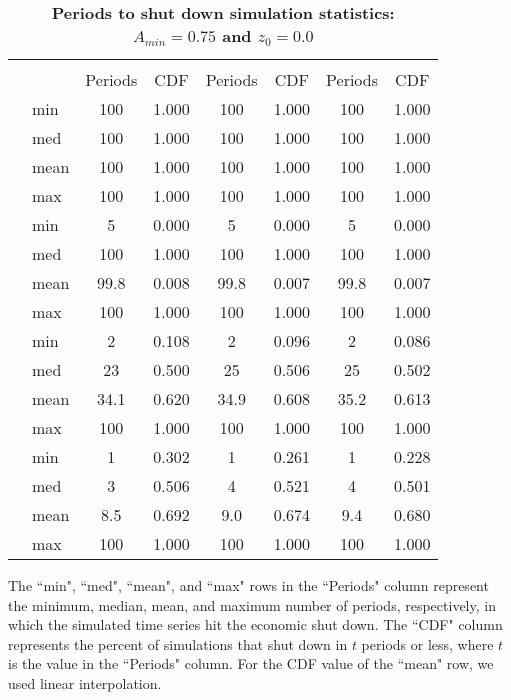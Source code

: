 \documentclass[letterpaper,12pt]{article}
\theoremstyle{definition}
\begin{document}
\begin{spacing}{1.5}
  \begin{table}[htbp]\centering\captionsetup{width=4.6in}
  \caption{\label{TabPer2GO_A75}\textbf{Periods to shut down simulation statistics: $A_{min}=0.75$ and $z_0=0.0$}}
    \begin{threeparttable}
    \begin{tabular}{>{\small}c >{\small}l| >{\small}c >{\small}c| >{\small}c >{\small}c| >{\small}c >{\small}c}
      \hline\hline
      & & \multicolumn{2}{c}{$k_{2,0}=0.11$} & \multicolumn{2}{c}{$k_{2,0}=0.14$} & \multicolumn{2}{c}{$k_{2,0}=0.17$} \\ \cline{3-8}
      & & Periods & CDF & Periods & CDF & Periods & CDF \\
      \hline
      \multirow{4}{*}{$\bar{H}=0.00$}
      & min & 100 & 1.000 & 100 & 1.000 & 100 & 1.000 \\
      & med & 100 & 1.000 & 100 & 1.000 & 100 & 1.000 \\
      & mean & 100 & 1.000 & 100 & 1.000 & 100 & 1.000 \\
      & max & 100 & 1.000 & 100 & 1.000 & 100 & 1.000 \\
      \hline
      \multirow{4}{*}{$\bar{H}=0.05$}
      & min & 5 & 0.000 & 5 & 0.000 & 5 & 0.000 \\
      & med & 100 & 1.000 & 100 & 1.000 & 100 & 1.000 \\
      & mean & 99.8 & 0.008 & 99.8 & 0.007 & 99.8 & 0.007 \\
      & max & 100 & 1.000 & 100 & 1.000 & 100 & 1.000 \\
      \hline
      \multirow{4}{*}{$\bar{H}=0.11$}
      & min & 2 & 0.108 & 2 & 0.096 & 2 & 0.086 \\
      & med & 23 & 0.500 & 25 & 0.506 & 25 & 0.502 \\
      & mean & 34.1 & 0.620 & 34.9 & 0.608 & 35.2 & 0.613 \\
      & max & 100 & 1.000 & 100 & 1.000 & 100 & 1.000 \\
      \hline
      \multirow{4}{*}{$\bar{H}=0.17$}
      & min & 1 & 0.302 & 1 & 0.261 & 1 & 0.228 \\
      & med & 3 & 0.506 & 4 & 0.521 & 4 & 0.501 \\
      & mean & 8.5 & 0.692 & 9.0 & 0.674 & 9.4 & 0.680 \\
      & max & 100 & 1.000 & 100 & 1.000 & 100 & 1.000 \\
      \hline\hline
    \end{tabular}
    \begin{tablenotes}
      \scriptsize{\item[]The ``min", ``med", ``mean", and ``max" rows in the ``Periods" column represent the minimum, median, mean, and maximum number of periods, respectively, in which the simulated time series hit the economic shut down. The ``CDF" column represents the percent of simulations that shut down in $t$ periods or less, where $t$ is the value in the ``Periods" column. For the CDF value of the ``mean" row, we used linear interpolation.}
    \end{tablenotes}
    \end{threeparttable}
  \end{table}


\end{spacing}
\end{document}
